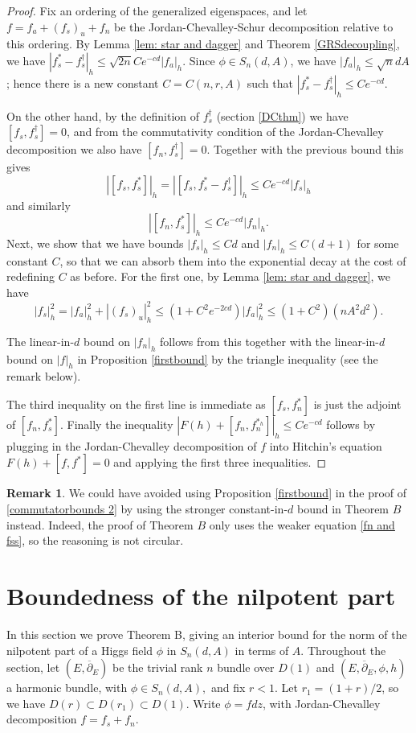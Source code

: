 \documentclass[10pt]{amsart}
\theoremstyle{definition}
\newtheorem{remark}[thm]{Remark}
\begin{document}
\begin{proof}
Fix an ordering of the generalized eigenspaces, and let $f = f_a + ({f_s})_u + f_n$ be the Jordan-Chevalley-Schur decomposition relative to this ordering. By Lemma \ref{lem: star and dagger} and Theorem \ref{GRSdecoupling}, we have $|f_s^* - f_s^\dagger|_h \leq \sqrt{2n}Ce^{-cd}|f_a|_h$. Since $\phi \in S_n(d,A)$, we have $|f_a|_h \leq \sqrt{n}dA$; hence there is a new constant $C = C(n, r, A)$ such that $|f_s^* - f_s^\dagger|_h \leq C e^{-cd}$.

On the other hand, by the definition of $f_s^\dagger$ (section \ref{DCthm}) we have $[f_s, f_s^\dagger] = 0$, and from the commutativity condition of the Jordan-Chevalley decomposition we also have $[f_n, f_s^\dagger] = 0$. Together with the previous bound this gives
\[
|[f_s,f_s^*]|_h = |[f_s,f_s^* - f_s^\dagger]|_h \leq Ce^{-cd}|f_s|_h
\]
and similarly
\begin{equation} \label{fn and fss}
|[f_n,f_s^*]|_h \leq Ce^{-cd}|f_n|_h.
\end{equation}
Next, we show that we have bounds $|f_s|_h \leq C d$ and $|f_n|_h \leq C (d+1)$ for some constant $C$, so that we can absorb them into the exponential decay at the cost of redefining $C$ as before. For the first one,
by Lemma \ref{lem: star and dagger}, we have
\[
|f_s|_h^2 = |f_a|_h^2 + |(f_s)_u|_h^2 \leq (1 + C^2e^{-2cd})|f_a|_h^2 \leq (1+C^2)(nA^2d^2).
\]

The linear-in-$d$ bound on $|f_n|_h$ follows from this together with the linear-in-$d$ bound on $|f|_h$ in Proposition \ref{firstbound} by the triangle inequality (see the remark below).

The third inequality on the first line is immediate as $[f_s, f_n^*]$ is just the adjoint of $[f_n, f_s^*]$. Finally the inequality $|F(h)+[f_n,f_n^{*_h}]|_{h}\leq Ce^{-cd}$ follows by plugging in the Jordan-Chevalley decomposition of $f$ into Hitchin's equation $F(h) + [f, f^*] = 0$ and applying the first three inequalities.
\end{proof}

\begin{remark}
    We could have avoided using Proposition \ref{firstbound} in the proof of \eqref{commutatorbounds 2} by using the stronger constant-in-$d$ bound in Theorem $B$ instead. Indeed, the proof of Theorem $B$ only uses the weaker equation \eqref{fn and fss}, so the reasoning is not circular.
\end{remark}


\section{Boundedness of the nilpotent part}\label{ThmAsection} 
In this section we prove Theorem B, giving an interior bound for the norm of the nilpotent part of a Higgs field $\phi$ in $S_n(d,A)$ in terms of $A$.
Throughout the section, let $(E,\overline{\partial}_E)$ be the trivial rank $n$ bundle over $D(1)$ and $(E,\overline{\partial}_E,\phi,h)$ a harmonic bundle, with $\phi \in S_n(d,A),$ and fix $r < 1$. Let $r_1 = (1+r)/2$, so we have $D(r)\subset D(r_1) \subset D(1).$ Write $\phi = f dz$, with Jordan-Chevalley decomposition $f = f_s + f_n$.
\end{document}

